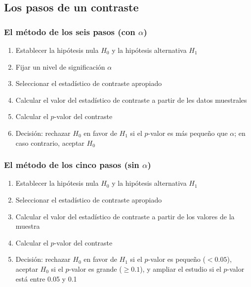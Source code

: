 \documentclass[12pt,t]{beamer}\usepackage[]{graphicx}\usepackage[]{color}
\renewcommand{\emph}[1]{{\color{red}#1}}
\renewcommand{\geq}{\geqslant}
\theoremstyle{plain}
\theoremstyle{definition}
\begin{document}
\subsection{Los pasos de un contraste}

\begin{frame}
\frametitle{El método de los \emph{seis} pasos (con $\alpha$)}

\begin{enumerate}[1)]
\item Establecer   la hipótesis nula  $H_{0}$   y la hipótesis alternativa  $H_{1}$
\smallskip

\item  Fijar un nivel   de significación   $\alpha$
\smallskip

\item Seleccionar el estadístico de contraste    apropiado 
\smallskip

\item Calcular el valor del estadístico de contraste a partir de les
datos muestrales
\smallskip

\item  Calcular el $p$-valor del contraste
\smallskip

\item \emph{Decisión:} rechazar $H_{0}$ en favor de $H_1$  si el $p$-valor es 
más pequeño que $\alpha$; en caso contrario, aceptar $H_{0}$
\end{enumerate}
\end{frame}


\begin{frame}
\frametitle{El método de los \emph{cinco} pasos (sin $\alpha$)}

\begin{enumerate}[1)]
\item Establecer   la hipótesis nula  $H_{0}$   y la hipótesis alternativa  $H_{1}$
\smallskip

\item Seleccionar el estadístico de contraste apropiado
\smallskip

\item Calcular el valor del estadístico de contraste a partir de los valores de la muestra
\smallskip

\item  Calcular el $p$-valor del contraste
\smallskip

\item \emph{Decisión:} rechazar $H_{0}$ en favor de $H_1$  si el $p$-valor es pequeño ($<0.05$), aceptar $H_{0}$ si el $p$-valor es grande ($\geq 0.1$), y ampliar el estudio si el $p$-valor está entre 0.05 y 0.1
\end{enumerate}
\end{frame}
\end{document}
